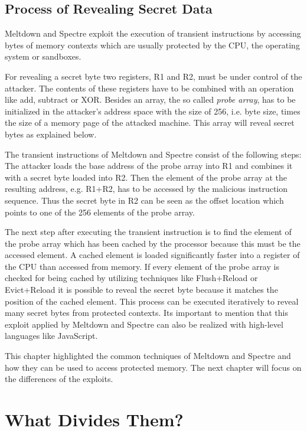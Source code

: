 \documentclass[a4paper,oneside,openright] {scrreprt}
\begin{document}
\subsection{Process of Revealing Secret Data}
\label{ch:intro:motivation:A}

Meltdown and Spectre exploit the execution of transient instructions by accessing bytes of memory contexts 
 which are usually protected by the CPU, the operating system or sandboxes. 

For revealing a secret byte two registers, R1 and R2, must be under control of the attacker. The contents of these registers have to be 
combined with an operation like add, subtract or XOR. Besides an array, the so called \textit{probe array}, has to be 
initialized in the attacker's address space with the size of 256, i.e. byte size, times the size of a memory page of the attacked machine.
This array will reveal secret bytes as explained below.

The transient instructions of Meltdown and Spectre consist of the following steps:
The attacker loads the base address of the probe array into R1 and combines it with a secret byte loaded into R2. 
Then the element of the probe array at the resulting address, e.g. R1+R2, has to be accessed by the malicious instruction sequence.
Thus the secret byte in R2 can be seen as the offset location which points to one of the 256 elements of the probe array.

The next step after executing the transient instruction is to find the element of the probe array which has been cached by the processor
because this must be the accessed element.
A cached element is loaded significantly faster into a register of the CPU than accessed from memory.
If every element of the probe array is checked for being cached by utilizing techniques like Flush+Reload or Evict+Reload it is possible
to reveal the secret byte because it matches the position of the cached element.
This process can be executed iteratively to reveal many secret bytes from protected contexts. Its important to mention that this exploit
applied by Meltdown and Spectre can also be realized with high-level languages like JavaScript.

This chapter highlighted the common techniques of Meltdown and Spectre and how they can be used to access protected memory.
The next chapter will focus on the differences of the exploits.

\section{What Divides Them?}
\label{ch:intro:motivation}
\end{document}
